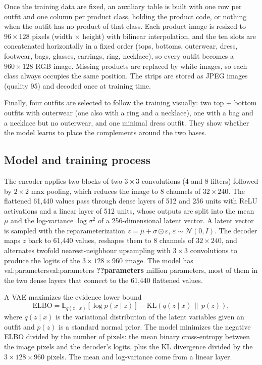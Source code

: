 \documentclass[10pt,a4paper,twocolumn]{article}
\DeclareRobustCommand{\val}[1]{%
  \ifcsname val:#1\endcsname\csname val:#1\endcsname
  \else\PackageWarning{report}{Missing value `#1'}\textbf{??#1}\fi}
\begin{document}
Once the training data are fixed, an auxiliary table is built with one row per outfit and one column per product class, holding the product code, or nothing when the outfit has no product of that class. Each product image is resized to $96 \times 128$ pixels (width $\times$ height) with bilinear interpolation, and the ten slots are concatenated horizontally in a fixed order (tops, bottoms, outerwear, dress, footwear, bags, glasses, earrings, ring, necklace), so every outfit becomes a $960 \times 128$ RGB image. Missing products are replaced by white images, so each class always occupies the same position. The strips are stored as JPEG images (quality 95) and decoded once at training time.

Finally, four outfits are selected to follow the training visually: two top + bottom outfits with outerwear (one also with a ring and a necklace), one with a bag and a necklace but no outerwear, and one minimal dress outfit. They show whether the model learns to place the complements around the two bases.

\subsection{Model and training process}

The encoder applies two blocks of two $3 \times 3$ convolutions (4 and 8 filters) followed by $2 \times 2$ max pooling, which reduces the image to 8 channels of $32 \times 240$. The flattened 61,440 values pass through dense layers of 512 and 256 units with ReLU activations and a linear layer of 512 units, whose outputs are split into the mean $\mu$ and the log-variance $\log\sigma^2$ of a 256-dimensional latent vector. A latent vector is sampled with the reparameterization $z = \mu + \sigma \odot \varepsilon$, $\varepsilon \sim \mathcal{N}(0, I)$. The decoder maps $z$ back to 61,440 values, reshapes them to 8 channels of $32 \times 240$, and alternates twofold nearest-neighbour upsampling with $3 \times 3$ convolutions to produce the logits of the $3 \times 128 \times 960$ image. The model has \val{parameters} million parameters, most of them in the two dense layers that connect to the 61,440 flattened values.

A VAE maximizes the evidence lower bound
\[
\mathrm{ELBO} = \mathbb{E}_{q(z \mid x)}\left[\log p(x \mid z)\right] - \mathrm{KL}\left(q(z \mid x) \,\|\, p(z)\right),
\]
where $q(z \mid x)$ is the variational distribution of the latent variables given an outfit and $p(z)$ is a standard normal prior. The model minimizes the negative ELBO divided by the number of pixels: the mean binary cross-entropy between the image pixels and the decoder's logits, plus the KL divergence divided by the $3 \times 128 \times 960$ pixels. The mean and log-variance come from a linear layer.
\end{document}
